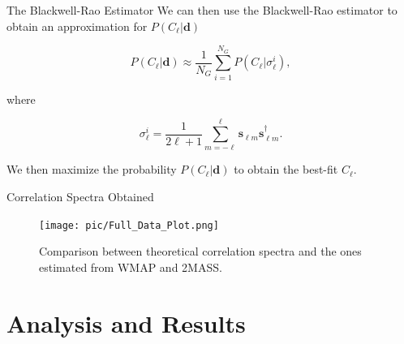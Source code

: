 \documentclass[serif, aspectratio=169]{beamer}
\begin{document}
\begin{frame}{The Blackwell-Rao Estimator}
    We can then use the Blackwell-Rao estimator to obtain an approximation for $P(C_\ell|\mathbf{d})$

    \begin{equation}
        P(C_\ell|\mathbf{d})\approx \frac{1}{N_G}\sum_{i=1}^{N_G}P(C_\ell|\sigma_\ell^i),
    \end{equation}

    where

    \begin{equation}
        \sigma_\ell^i = \frac{1}{2\ell+1}\sum_{m=-\ell}^\ell \mathbf{s}_{\ell m}\mathbf{s}_{\ell m}^\dagger.
    \end{equation}

    We then maximize the probability $P(C_\ell|\mathbf{d})$ to obtain the best-fit $C_\ell$.
\end{frame}

\begin{frame}{Correlation Spectra Obtained}
    \begin{figure}
        \centering
        \texttt{[image: pic/Full\_Data\_Plot.png]}
        \caption{Comparison between theoretical correlation spectra and the ones estimated from WMAP and 2MASS.}
        \label{fig:correlations_obtained}
    \end{figure}
\end{frame}

\section{Analysis and Results}
\end{document}
